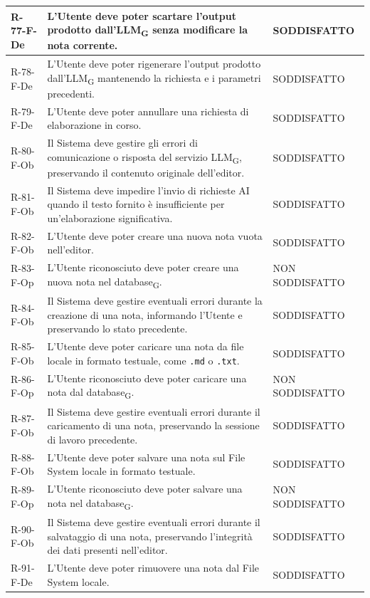 \documentclass[a4paper, 10pt]{article}
\begin{document}
\begin{longtable}{|p{2.1cm}|p{9.6cm}|p{2.6cm}|}
    R-77-F-De & L'Utente deve poter scartare l'output prodotto dall'LLM\textsubscript{G} senza modificare la nota corrente. & SODDISFATTO \\ \hline
    R-78-F-De & L'Utente deve poter rigenerare l'output prodotto dall'LLM\textsubscript{G} mantenendo la richiesta e i parametri precedenti. & SODDISFATTO \\ \hline
    R-79-F-De & L'Utente deve poter annullare una richiesta di elaborazione in corso. & SODDISFATTO \\ \hline
    R-80-F-Ob & Il Sistema deve gestire gli errori di comunicazione o risposta del servizio LLM\textsubscript{G}, preservando il contenuto originale dell'editor. & SODDISFATTO \\ \hline
    R-81-F-Ob & Il Sistema deve impedire l'invio di richieste AI quando il testo fornito è insufficiente per un'elaborazione significativa. & SODDISFATTO \\ \hline
    R-82-F-Ob & L'Utente deve poter creare una nuova nota vuota nell'editor. & SODDISFATTO \\ \hline
    R-83-F-Op & L'Utente riconosciuto deve poter creare una nuova nota nel database\textsubscript{G}. & NON SODDISFATTO \\ \hline
    R-84-F-Ob & Il Sistema deve gestire eventuali errori durante la creazione di una nota, informando l'Utente e preservando lo stato precedente. & SODDISFATTO \\ \hline
    R-85-F-Ob & L'Utente deve poter caricare una nota da file locale in formato testuale, come \texttt{.md} o \texttt{.txt}. & SODDISFATTO \\ \hline
    R-86-F-Op & L'Utente riconosciuto deve poter caricare una nota dal database\textsubscript{G}. & NON SODDISFATTO \\ \hline
    R-87-F-Ob & Il Sistema deve gestire eventuali errori durante il caricamento di una nota, preservando la sessione di lavoro precedente. & SODDISFATTO \\ \hline
    R-88-F-Ob & L'Utente deve poter salvare una nota sul File System locale in formato testuale. & SODDISFATTO \\ \hline
    R-89-F-Op & L'Utente riconosciuto deve poter salvare una nota nel database\textsubscript{G}. & NON SODDISFATTO \\ \hline
    R-90-F-Ob & Il Sistema deve gestire eventuali errori durante il salvataggio di una nota, preservando l'integrità dei dati presenti nell'editor. & SODDISFATTO \\ \hline
    R-91-F-De & L'Utente deve poter rimuovere una nota dal File System locale. & SODDISFATTO \\ \hline

\end{longtable}
\end{document}
